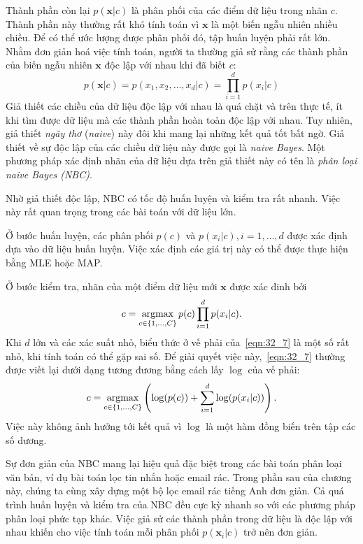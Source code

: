 Thành phần còn lại $p(\mathbf{x} | c)$ là phân phối của các điểm dữ liệu trong
nhãn $c$. Thành phần này thường rất khó tính toán vì $\mathbf{x}$ là một biến
ngẫu nhiên nhiều chiều. Để có thể ước lượng được phân phối đó, tập huấn luyện
phải rất lớn. Nhằm đơn giản hoá việc tính toán, người ta thường giả sử
rằng các thành phần của biến ngẫu nhiên $\mathbf{x}$ độc lập với nhau khi đã
biết $c$:
\begin{equation}
\label{eqn:32_6}
p(\mathbf{x} | c) = p(x_1, x_2, \dots, x_d | c) =  \prod_{i = 1}^d p(x_i | c)
\end{equation}
Giả thiết các chiều của dữ liệu độc lập với nhau là quá chặt và trên thực tế, ít
khi tìm được dữ liệu mà các thành phần hoàn toàn độc lập với nhau. Tuy nhiên,
giả thiết \textit{ngây thơ} (\textit{naive}) này đôi khi mang lại những kết quả
tốt bất ngờ. Giả thiết về sự độc lập của các chiều dữ liệu này được gọi là
\textit{naive Bayes}. Một phương pháp xác định nhãn của dữ liệu dựa trên giả
thiết này có tên là \textit{phân loại naive Bayes (NBC)}.

Nhờ giả thiết độc lập, NBC có tốc độ huấn luyện và
kiểm tra rất nhanh. Việc này rất quan trọng trong các bài toán với dữ liệu lớn.

Ở bước huấn luyện, các phân phối $p(c)$ và $p(x_i | c), i = 1, \dots, d$ được xác định dựa vào dữ liệu huấn luyện. Việc xác định các giá trị này có thể được thực hiện bằng MLE hoặc MAP.

Ở bước kiểm tra, nhãn của một điểm dữ liệu mới $\mathbf{x}$ được xác đinh bởi
\begin{equation}
\label{eqn:32_7}
c = \operatorname*{argmax}_{c \in \{1, \dots, C\}} p(c) \prod_{i=1}^d p(x_i | c).
\end{equation}
Khi $d$ lớn và các xác suất nhỏ, biểu thức ở vế phải của~\eqref{eqn:32_7} là một
số rất nhỏ, khi tính toán có thể gặp sai số. Để giải quyết việc
này,~\eqref{eqn:32_7} thường được viết lại dưới dạng tương đương bằng cách lấy
$\log$ của vế phải:
\begin{equation}
\label{eqn:32_7_1}
c = \operatorname*{argmax}_{c \in \{1, \dots, C\}} \left(\log(p(c)) + \sum_{i=1}^d \log(p(x_i
| c))\right).
\end{equation}
Việc này không ảnh hưởng tới kết quả vì $\log$ là một hàm đồng biến trên tập các số dương.

Sự đơn giản của NBC mang lại hiệu quả đặc biệt trong các bài toán phân loại văn
bản, ví dụ bài toán lọc tin nhắn hoặc email rác. Trong phần sau của
chương này, chúng ta cùng xây dựng một bộ lọc email rác tiếng Anh đơn giản.
Cả quá trình huấn luyện và kiểm tra của NBC đều cực kỳ nhanh so với các phương
pháp phân loại phức tạp khác. Việc giả sử các thành phần trong dữ liệu là độc
lập với nhau khiến cho việc tính toán mỗi phân phối $p(\mathbf{x}_i|c)$ trở nên đơn giản.

